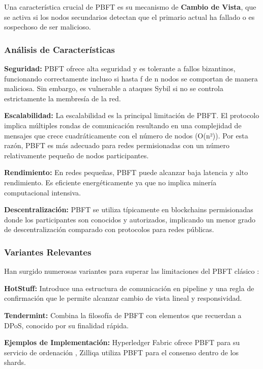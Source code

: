 \documentclass[spanish,12pt,letterpaper]{report}
\begin{document}
Una característica crucial de PBFT es su mecanismo de \textbf{Cambio de Vista}, que se activa si los nodos secundarios detectan que el primario actual ha fallado o es sospechoso de ser malicioso.

\subsubsection{Análisis de Características}

\textbf{Seguridad:} PBFT ofrece alta seguridad y es tolerante a fallos bizantinos, funcionando correctamente incluso si hasta f de n nodos se comportan de manera maliciosa. Sin embargo, es vulnerable a ataques Sybil si no se controla estrictamente la membresía de la red.

\textbf{Escalabilidad:} La escalabilidad es la principal limitación de PBFT. El protocolo implica múltiples rondas de comunicación resultando en una complejidad de mensajes que crece cuadráticamente con el número de nodos (O(n²)). Por esta razón, PBFT es más adecuado para redes permisionadas con un número relativamente pequeño de nodos participantes.

\textbf{Rendimiento:} En redes pequeñas, PBFT puede alcanzar baja latencia y alto rendimiento. Es eficiente energéticamente ya que no implica minería computacional intensiva.

\textbf{Descentralización:} PBFT se utiliza típicamente en blockchains permisionadas donde los participantes son conocidos y autorizados, implicando un menor grado de descentralización comparado con protocolos para redes públicas.

\subsubsection{Variantes Relevantes}

Han surgido numerosas variantes para superar las limitaciones del PBFT clásico \parencite{mdpi2025pbft}:

\textbf{HotStuff:} Introduce una estructura de comunicación en pipeline y una regla de confirmación que le permite alcanzar cambio de vista lineal y responsividad.

\textbf{Tendermint:} Combina la filosofía de PBFT con elementos que recuerdan a DPoS, conocido por su finalidad rápida.

\textbf{Ejemplos de Implementación:} Hyperledger Fabric ofrece PBFT para su servicio de ordenación \parencite{hyperledger2025fabric}, Zilliqa utiliza PBFT para el consenso dentro de los shards.
\end{document}
